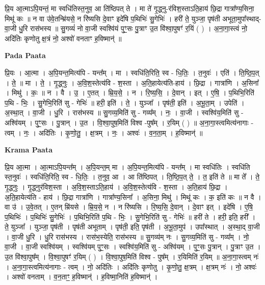 \documentclass[17pt]{extarticle}
\begin{document}
प्रि॒य आ॒त्माऽपि॒यन्तं॒ मा स्वधि॑तिस्त॒नुव॒ आ ति॑ष्ठिपत् ते । मा ते॑ गृ॒द्ध्नु-र॑विश॒स्ताऽति॒हाय॑ छि॒द्रा गात्रा᳚ण्य॒सिना॒ मिथू॑ कः ॥ न वा उ॑वे॒तन्म्रि॑यसे॒ न रि॑ष्यसि दे॒वाꣳ इदे॑षि प॒थिभिः॑ सु॒गेभिः॑ । हरी॑ ते॒ युञ्जा॒ पृष॑ती अभूता॒मुपा᳚स्थाद्-वा॒जी धु॒रि रास॑भस्य ॥ सु॒गव्यं॑ नो वा॒जी स्वश्वि॑यं पुꣳ॒॒सः पु॒त्राꣳ उ॒त वि॑श्वा॒पुषꣳ॑ र॒यिं ( ) । अ॒ना॒गा॒स्त्वं नो॒ अदि॑तिः कृणोतु क्ष॒त्रं नो॒ अश्वो॑ वनताꣳ ह॒विष्मान्॑ ॥ \newline

\textbf{Pada Paata} \newline

प्रि॒यः । आ॒त्मा । अ॒पि॒यन्त॒मित्य॑पि - यन्त᳚म् । मा । स्वधि॑ति॒रिति॒ स्व - धि॒तिः॒ । त॒नुवः॑ । एति॑ । ति॒ष्ठि॒प॒त् । ते॒ ॥ मा । ते॒ । गृ॒द्ध्नुः । अ॒वि॒श॒स्तेत्य॑वि - श॒स्ता । अ॒ति॒हायेत्य॑ति-हाय॑ । छि॒द्रा । गात्रा॑णि । अ॒सिना᳚ । मिथु॑ । कः॒ ॥ न । वै । उ॒ । ए॒तत् । म्रि॒य॒से॒ । न । रि॒ष्य॒सि॒ । दे॒वान् । इत् । ए॒षि॒ । प॒थिभि॒रिति॑ प॒थि - भिः॒ । सु॒गेभि॒रिति॑ सु - गेभिः॑ ॥ हरी॒ इति॑ । ते॒ । युञ्जा᳚ । पृष॑ती॒ इति॑ । अ॒भू॒ता॒म् । उपेति॑ । अ॒स्था॒त् । वा॒जी । धु॒रि । रास॑भस्य ॥ सु॒गव्य॒मिति॑ सु - गव्य᳚म् । नः॒ । वा॒जी । स्वश्वि॑य॒मिति॑ सु - अश्वि॑यम् । पुꣳ॒॒सः । पु॒त्रान् । उ॒त । वि॒श्वा॒पुष॒मिति॑ विश्व -पुष᳚म् । र॒यिम् ( ) ॥ अ॒ना॒गा॒स्त्वमित्य॑नागाः - त्वम् । नः॒ । अदि॑तिः । कृ॒णो॒तु॒ । क्ष॒त्रम् । नः॒ । अश्वः॑ । व॒न॒ता॒म् । ह॒विष्मान्॑ ॥  \newline


\textbf{Krama Paata} \newline

प्रि॒य आ॒त्मा । आ॒त्माऽपि॒यन्त᳚म् । अ॒पि॒यन्त॒म् मा । अ॒पि॒यन्त॒मित्य॑पि - यन्त᳚म् । मा स्वधि॑तिः । स्वधि॑ति स्त॒नुवः॑ । स्वधि॑ति॒रिति॒ स्व - धि॒तिः॒ । त॒नुव॒ आ । आ ति॑ष्ठिपत् । ति॒ष्ठि॒प॒त् ते॒ । त॒ इति॑ ते ॥ मा ते᳚ । ते॒ गृ॒द्ध्नुः । गृ॒द्ध्नुर॑विश॒स्ता । अ॒वि॒श॒स्ताऽति॒हाय॑ । अ॒वि॒श॒स्तेत्य॑वि - श॒स्ता । अ॒ति॒हाय॑ छि॒द्रा । अ॒ति॒हायेत्य॑ति - हाय॑ । छि॒द्रा गात्रा॑णि । गात्रा᳚ण्य॒सिना᳚ । अ॒सिना॒ मिथु॑ । मिथू॑ कः । क॒ इति॑ कः ॥ न वै । वा उ॑ । उ॒वे॒तत् । ए॒तन् म्रि॑यसे । म्रि॒य॒से॒ न । न रि॑ष्यसि । रि॒ष्य॒सि॒ दे॒वान् । दे॒वाꣳ इत् । इदे॑षि । ए॒षि॒ प॒थिभिः॑ । प॒थिभिः॑ सु॒गेभिः॑ । प॒थिभि॒रिति॑ प॒थि - भिः॒ । सु॒गेभि॒रिति॑ सु - गेभिः॑ ॥ हरी॑ ते । हरी॒ इति॒ हरी᳚ । ते॒ युञ्जा᳚ । युञ्जा॒ पृष॑ती । पृष॑ती अभूताम् । पृष॑ती॒ इति॒ पृष॑ती । अ॒भू॒ता॒मुप॑ । उपा᳚स्थात् । अ॒स्था॒द् वा॒जी । वा॒जी धु॒रि । धु॒रि रास॑भस्य । रास॑भ॒स्येति॒ रास॑भस्य ॥ सु॒गव्य॑म् नः । सु॒गव्य॒मिति॑ सु - गव्य᳚म् । नो॒ वा॒जी । वा॒जी स्वश्वि॑यम् । स्वश्वि॑यम् पुꣳ॒॒सः । स्वश्वि॑य॒मिति॑ सु - अश्वि॑यम् । पुꣳ॒॒सः पु॒त्रान् । पु॒त्राꣳ उ॒त । उ॒त वि॑श्वा॒पुष᳚म् । वि॒श्वा॒पुषꣳ॑ र॒यिम् ( ) । वि॒श्वा॒पुष॒मिति॑ विश्व - पुष᳚म् । र॒यिमिति॑ र॒यिम् ॥ अ॒ना॒गा॒स्त्वम् नः॑ । अ॒ना॒गा॒स्त्वमित्य॑नागाः - त्वम् । नो॒ अदि॑तिः । अदि॑तिः कृणोतु । कृ॒णो॒तु॒ क्ष॒त्रम् । क्ष॒त्रम् नः॑ । नो॒ अश्वः॑ । अश्वो॑ वनताम् । व॒न॒ताꣳ॒॒ ह॒विष्मान्॑ । ह॒विष्मा॒निति॑ ह॒विष्मान्॑ । \newline
\end{document}

